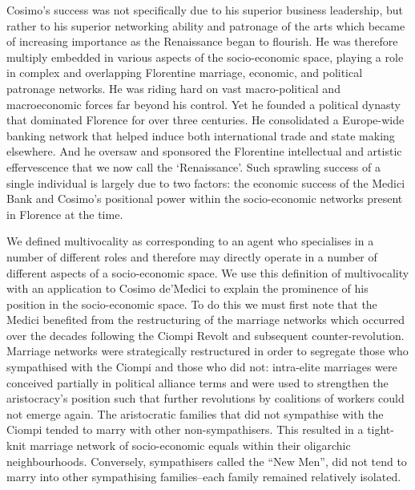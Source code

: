 Cosimo's success was not specifically due to his superior business leadership, but rather to his superior networking ability and patronage of the arts which became of increasing importance as the Renaissance began to flourish. He was therefore multiply embedded in various aspects of the socio-economic space, playing a role in complex and overlapping Florentine marriage, economic, and political patronage networks. He was riding hard on vast macro-political and macroeconomic forces far beyond his control. Yet he founded a political dynasty that dominated Florence for over three centuries. He consolidated a Europe-wide banking network that helped induce both international trade and state making elsewhere. And he oversaw and sponsored the Florentine intellectual and artistic effervescence that we now call the `Renaissance'. Such sprawling success of a single individual is largely due to two factors: the economic success of the Medici Bank and Cosimo's positional power within the socio-economic networks present in Florence at the time.

We defined multivocality as corresponding to an agent who specialises in a number of different roles and therefore may directly operate in a number of different aspects of a socio-economic space. We use this definition of multivocality with an application to Cosimo de'Medici to explain the prominence of his position in the socio-economic space. To do this we must first note that the Medici benefited from the restructuring of the marriage networks which occurred over the decades following the Ciompi Revolt and subsequent counter-revolution. Marriage networks were strategically restructured in order to segregate those who sympathised with the Ciompi and those who did not: intra-elite marriages were conceived partially in political alliance terms and were used to strengthen the aristocracy's position such that further revolutions by coalitions of workers could not emerge again. The aristocratic families that did not sympathise with the Ciompi tended to marry with other non-sympathisers. This resulted in a tight-knit marriage network of socio-economic equals within their oligarchic neighbourhoods. Conversely, sympathisers called the ``New Men'', did not tend to marry into other sympathising families--each family remained relatively isolated.

